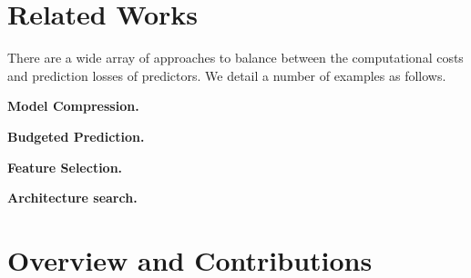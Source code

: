 \section{Related Works}
\label{sec:related_works}

There are a wide array of approaches to balance between the computational costs and prediction losses of predictors. We detail a number of examples as follows.

\textbf{Model Compression.}

\textbf{Budgeted Prediction.}

\textbf{Feature Selection.}

\textbf{Architecture search.}



\section{Overview and Contributions}

